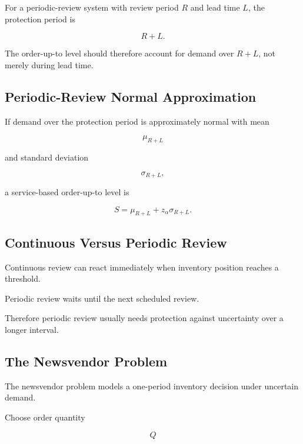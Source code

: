 For a periodic-review system with review period \(R\) and lead time \(L\),
the protection period is

\[
\boxed{
R+L.
}
\]

The order-up-to level should therefore account for demand over \(R+L\),
not merely during lead time.

\subsection{Periodic-Review Normal Approximation}
\label{subsec:periodic-review-normal}

If demand over the protection period is approximately normal with mean

\[
\mu_{R+L}
\]

and standard deviation

\[
\sigma_{R+L},
\]

a service-based order-up-to level is

\[
\boxed{
S
=
\mu_{R+L}
+
z_\alpha
\sigma_{R+L}.
}
\]

\subsection{Continuous Versus Periodic Review}
\label{subsec:continuous-versus-periodic-inventory}

Continuous review can react immediately when inventory position reaches a
threshold.

Periodic review waits until the next scheduled review.

Therefore periodic review usually needs protection against uncertainty
over a longer interval.

\subsection{The Newsvendor Problem}
\label{subsec:newsvendor-problem}

The newsvendor problem models a one-period inventory decision under
uncertain demand.

Choose order quantity

\[
\boxed{
Q
}
\]


